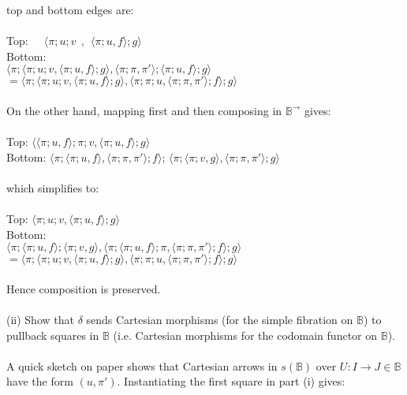 \documentclass{article}
\begin{document}
top and bottom edges are:\\~\\
Top: $~~~~~\langle \pi;u;v~~,~~\langle \pi;u , f \rangle; g \rangle$\\
Bottom:\\$\langle \pi; \langle \pi;u;v, \langle \pi;u , f \rangle; g \rangle, \langle \pi;\pi, \pi' \rangle; \langle \pi;u, f \rangle; g \rangle$\\
$= \langle \pi; \langle \pi;u;v, \langle \pi;u , f \rangle; g \rangle, \langle \pi;\pi;u, \langle \pi;\pi, \pi' \rangle; f \rangle; g \rangle$\\~\\
On the other hand, mapping first and then composing in $\mathbb B^{\to}$ gives:\\~\\
Top: $\langle \langle \pi;u, f \rangle; \pi; v, \langle \pi;u, f \rangle;g \rangle$\\
Bottom: $\langle \pi;\langle \pi;u , f \rangle, \langle \pi;\pi, \pi' \rangle; f \rangle$;
$\langle \pi;\langle \pi;v , g \rangle, \langle \pi;\pi, \pi' \rangle; g \rangle$\\~\\
which simplifies to: \\~\\
Top: $\langle \pi;u;v , \langle \pi;u, f \rangle;g \rangle$\\
Bottom:\\$\langle \pi; \langle \pi;u, f \rangle; \langle \pi;v, g \rangle, \langle \pi;\langle\pi;u, f \rangle;\pi, 
\langle \pi;\pi, \pi' \rangle;f \rangle;g \rangle$\\
$= \langle \pi; \langle \pi;u;v, \langle \pi;u, f \rangle;g \rangle, \langle \pi;\pi;u, 
\langle \pi;\pi, \pi' \rangle;f \rangle;g \rangle$
\\~\\
Hence composition is preserved.\\~\\
(ii) Show that $\delta$ sends Cartesian morphisms (for the simple fibration on $\mathbb B$) to pullback squares in 
$\mathbb B$ (i.e. Cartesian morphisms for the codomain functor on $\mathbb B$).\\~\\
A quick sketch on paper shows that Cartesian arrows in $s(\mathbb B)$ over $U : I \to J \in \mathbb B$ 
have the form $(u,\pi')$. Instantiating the first square in part (i) gives:
\begin{center}
\end{center}
\end{document}
